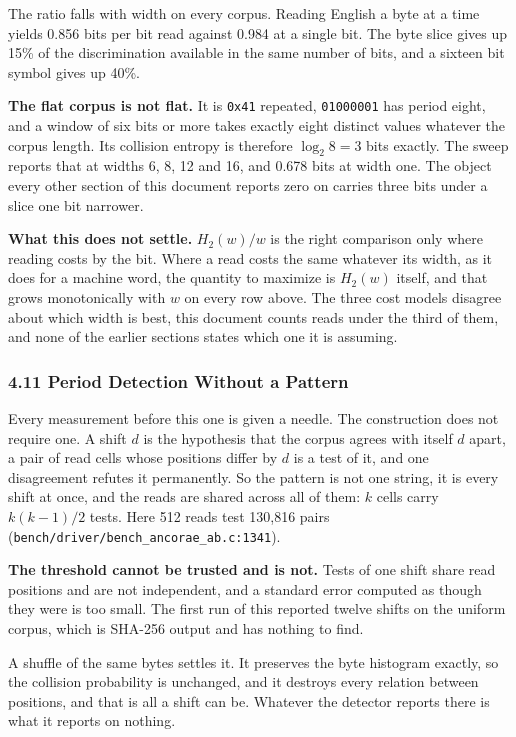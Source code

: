 The ratio falls with width on every corpus. Reading English a byte at a time yields 0.856 bits per bit read against 0.984 at a single bit. The byte slice gives up 15\% of the discrimination available in the same number of bits, and a sixteen bit symbol gives up 40\%.

\noindent\textbf{The flat corpus is not flat.} It is \texttt{0x41} repeated, \texttt{01000001} has period eight, and a window of six bits or more takes exactly eight distinct values whatever the corpus length. Its collision entropy is therefore \(\log_2 8 = 3\) bits exactly. The sweep reports that at widths 6, 8, 12 and 16, and 0.678 bits at width one. The object every other section of this document reports zero on carries three bits under a slice one bit narrower.

\noindent\textbf{What this does not settle.} \(H_2(w)/w\) is the right comparison only where reading costs by the bit. Where a read costs the same whatever its width, as it does for a machine word, the quantity to maximize is \(H_2(w)\) itself, and that grows monotonically with \(w\) on every row above. The three cost models disagree about which width is best, this document counts reads under the third of them, and none of the earlier sections states which one it is assuming.

\subsubsection{4.11 Period Detection Without a Pattern}

Every measurement before this one is given a needle. The construction does not require one. A shift \(d\) is the hypothesis that the corpus agrees with itself \(d\) apart, a pair of read cells whose positions differ by \(d\) is a test of it, and one disagreement refutes it permanently. So the pattern is not one string, it is every shift at once, and the reads are shared across all of them: \(k\) cells carry \(k(k-1)/2\) tests. Here 512 reads test 130,816 pairs (\texttt{bench/\allowbreak{}driver/\allowbreak{}bench\_\allowbreak{}ancorae\_\allowbreak{}ab.\allowbreak{}c:1341}).

\noindent\textbf{The threshold cannot be trusted and is not.} Tests of one shift share read positions and are not independent, and a standard error computed as though they were is too small. The first run of this reported twelve shifts on the uniform corpus, which is SHA-256 output and has nothing to find.

A shuffle of the same bytes settles it. It preserves the byte histogram exactly, so the collision probability is unchanged, and it destroys every relation between positions, and that is all a shift can be. Whatever the detector reports there is what it reports on nothing.

